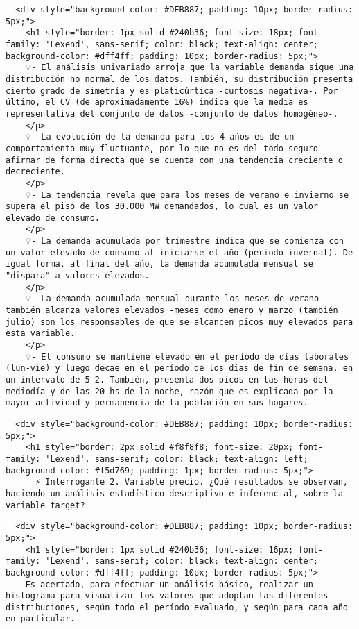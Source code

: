 \documentclass[11pt]{article}
\begin{document}
    
    
    \begin{verbatim}
  <div style="background-color: #DEB887; padding: 10px; border-radius: 5px;">
    <h1 style="border: 1px solid #240b36; font-size: 18px; font-family: 'Lexend', sans-serif; color: black; text-align: center; background-color: #dff4ff; padding: 10px; border-radius: 5px;">
    💡- El análisis univariado arroja que la variable demanda sigue una distribución no normal de los datos. También, su distribución presenta cierto grado de simetría y es platicúrtica -curtosis negativa-. Por último, el CV (de aproximadamente 16%) indica que la media es representativa del conjunto de datos -conjunto de datos homogéneo-.
    </p>
    💡- La evolución de la demanda para los 4 años es de un comportamiento muy fluctuante, por lo que no es del todo seguro afirmar de forma directa que se cuenta con una tendencia creciente o decreciente.
    </p>
    💡- La tendencia revela que para los meses de verano e invierno se supera el piso de los 30.000 MW demandados, lo cual es un valor elevado de consumo.
    </p>
    💡- La demanda acumulada por trimestre indica que se comienza con un valor elevado de consumo al iniciarse el año (periodo invernal). De igual forma, al final del año, la demanda acumulada mensual se "dispara" a valores elevados.
    </p>
    💡- La demanda acumulada mensual durante los meses de verano también alcanza valores elevados -meses como enero y marzo (también julio) son los responsables de que se alcancen picos muy elevados para esta variable.
    </p>
    💡- El consumo se mantiene elevado en el período de días laborales (lun-vie) y luego decae en el período de los días de fin de semana, en un intervalo de 5-2. También, presenta dos picos en las horas del mediodía y de las 20 hs de la noche, razón que es explicada por la mayor actividad y permanencia de la población en sus hogares.
\end{verbatim}

    \begin{verbatim}
  <div style="background-color: #DEB887; padding: 10px; border-radius: 5px;">
    <h1 style="border: 2px solid #f8f8f8; font-size: 20px; font-family: 'Lexend', sans-serif; color: black; text-align: left; background-color: #f5d769; padding: 1px; border-radius: 5px;">
      ⚡ Interrogante 2. Variable precio. ¿Qué resultados se observan, haciendo un análisis estadístico descriptivo e inferencial, sobre la variable target?
\end{verbatim}

    \begin{verbatim}
  <div style="background-color: #DEB887; padding: 10px; border-radius: 5px;">
    <h1 style="border: 1px solid #240b36; font-size: 16px; font-family: 'Lexend', sans-serif; color: black; text-align: center; background-color: #dff4ff; padding: 10px; border-radius: 5px;">
    Es acertado, para efectuar un análisis básico, realizar un histograma para visualizar los valores que adoptan las diferentes distribuciones, según todo el período evaluado, y según para cada año en particular.
\end{verbatim}
\end{document}
